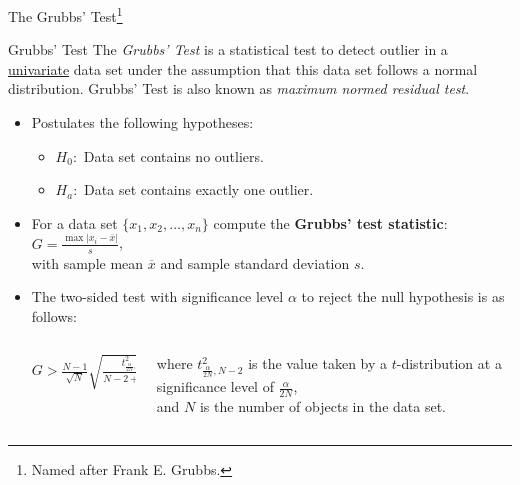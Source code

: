 \begin{frame}{The Grubbs' Test\footnote{Named after Frank E. Grubbs.}}
	\begin{block}{Grubbs' Test}
		The \textit{Grubbs' Test} is a statistical test to detect outlier in a \underline{univariate} data set under the assumption that this data set follows a normal distribution. Grubbs' Test is also known as \textit{maximum normed residual test}.
	\end{block}
	\begin{itemize}
		\item Postulates the following hypotheses:
		      \begin{itemize}
			      \item $H_0:$ Data set contains no outliers.
			      \item $H_a:$ Data set contains exactly one outlier.
		      \end{itemize}
		\item For a data set $\{x_1, x_2, \dots, x_n\}$ compute the \textbf{Grubbs' test statistic}:  $G = \frac{\max\vert x_i - \overline{x}\vert}{s}$,\\
		      with sample mean $\overline{x}$ and  sample standard deviation $s$.

		\item The two-sided test with significance level $\alpha$ to reject the null hypothesis is as follows:
		      \begin{columns}
			      \begin{column}{0.3\columnwidth}
				      \vspace*{-1em}
				      \begin{flushright}
					      $G > \frac{N-1}{\sqrt{N}} \sqrt{\frac{t^2_{\frac{\alpha}{2N},N-2}}{N-2 + t^2_{\frac{\alpha}{2N},N-2}}}$
				      \end{flushright}
				      \vspace*{0.5em}
			      \end{column}
			      \begin{column}{0.6\columnwidth}
				      where $t^2_{\frac{\alpha}{2N},N-2}$ is the value taken by a $t$-distribution at a significance level of $\frac{\alpha}{2N}$,\\ and $N$ is the number of objects in the data set.
			      \end{column}
		      \end{columns}

	\end{itemize}
\end{frame}


